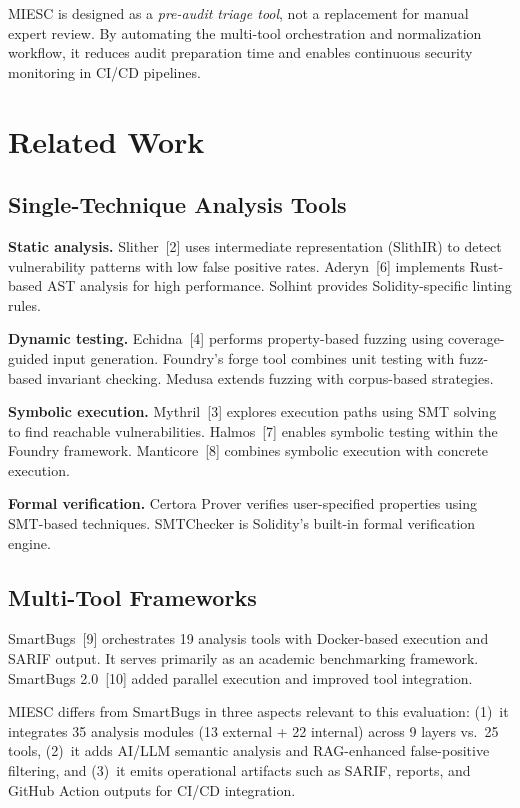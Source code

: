 \documentclass[conference]{IEEEtran}
\begin{document}
MIESC is designed as a \emph{pre-audit triage tool}, not a replacement for manual expert review. By automating the multi-tool orchestration and normalization workflow, it reduces audit preparation time and enables continuous security monitoring in CI/CD pipelines.

\section{Related Work}

\subsection{Single-Technique Analysis Tools}

\textbf{Static analysis.} Slither~[2] uses intermediate representation (SlithIR) to detect vulnerability patterns with low false positive rates. Aderyn~[6] implements Rust-based AST analysis for high performance. Solhint provides Solidity-specific linting rules.

\textbf{Dynamic testing.} Echidna~[4] performs property-based fuzzing using coverage-guided input generation. Foundry's forge tool combines unit testing with fuzz-based invariant checking. Medusa extends fuzzing with corpus-based strategies.

\textbf{Symbolic execution.} Mythril~[3] explores execution paths using SMT solving to find reachable vulnerabilities. Halmos~[7] enables symbolic testing within the Foundry framework. Manticore~[8] combines symbolic execution with concrete execution.

\textbf{Formal verification.} Certora Prover verifies user-specified properties using SMT-based techniques. SMTChecker is Solidity's built-in formal verification engine.

\subsection{Multi-Tool Frameworks}

SmartBugs~[9] orchestrates 19 analysis tools with Docker-based execution and SARIF output. It serves primarily as an academic benchmarking framework. SmartBugs 2.0~[10] added parallel execution and improved tool integration.

MIESC differs from SmartBugs in three aspects relevant to this evaluation: (1)~it integrates 35 analysis modules (13 external + 22 internal) across 9 layers vs.\ 25 tools, (2)~it adds AI/LLM semantic analysis and RAG-enhanced false-positive filtering, and (3)~it emits operational artifacts such as SARIF, reports, and GitHub Action outputs for CI/CD integration.
\end{document}
